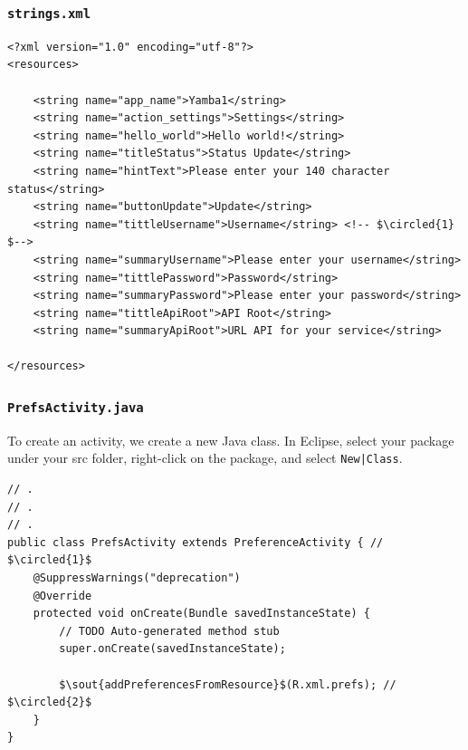 \begin{frame}[containsverbatim]
\frametitle{\texttt{strings.xml}}
\lstset{language=XML, style=eclipse}
\begin{adjustbox}{width=1.0 \textwidth}
\begin{lstlisting}[caption=res/values/strings.xml, basicstyle=\scriptsize,escapechar=$]
<?xml version="1.0" encoding="utf-8"?>
<resources>

    <string name="app_name">Yamba1</string>
    <string name="action_settings">Settings</string>
    <string name="hello_world">Hello world!</string>
    <string name="titleStatus">Status Update</string>
    <string name="hintText">Please enter your 140 character status</string>
    <string name="buttonUpdate">Update</string>
    <string name="tittleUsername">Username</string> <!-- $\circled{1} $-->
    <string name="summaryUsername">Please enter your username</string>
    <string name="tittlePassword">Password</string>
    <string name="summaryPassword">Please enter your password</string>
    <string name="tittleApiRoot">API Root</string>
    <string name="summaryApiRoot">URL API for your service</string>

</resources>
\end{lstlisting}
\end{adjustbox}
\end{frame}
\begin{frame}[containsverbatim]
\frametitle{\texttt{PrefsActivity.java}}
To create an activity, we create a new Java class. In Eclipse, select your package under
your src folder, right-click on the package, and select \texttt{New|Class}.
\lstset{language=java, style=eclipse}
\begin{adjustbox}{width=1.0 \textwidth}
\begin{lstlisting}[caption=src/com.artemisa.yamba/PrefsActivity.java, basicstyle=\scriptsize,escapechar=$]
// .
// .
// .
public class PrefsActivity extends PreferenceActivity { // $\circled{1}$
	@SuppressWarnings("deprecation")
	@Override
	protected void onCreate(Bundle savedInstanceState) { 
		// TODO Auto-generated method stub
		super.onCreate(savedInstanceState);

		$\sout{addPreferencesFromResource}$(R.xml.prefs); // $\circled{2}$
	}
}
\end{lstlisting}
\end{adjustbox}
\end{frame}
